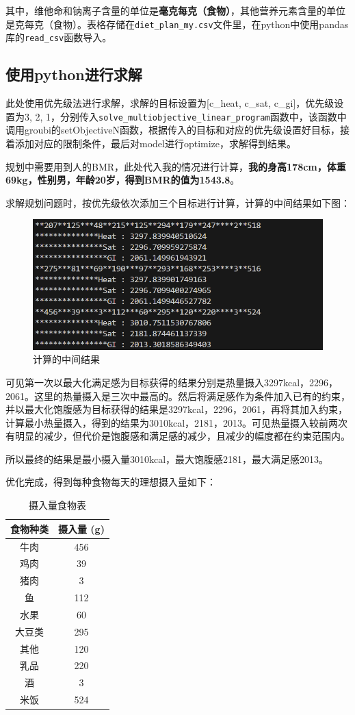 \documentclass{SYSUReport}
\begin{document}
其中，维他命和钠离子含量的单位是\textbf{毫克每克（食物）}，其他营养元素含量的单位是克每克（食物）。表格存储在\texttt{diet\_plan\_my.csv}文件里，在python中使用pandas库的\texttt{read\_csv}函数导入。

\subsection{使用python进行求解}
此处使用优先级法进行求解，求解的目标设置为[c\_heat, c\_sat, c\_gi]，优先级设置为3, 2, 1，分别传入\texttt{solve\_multiobjective\_linear\_program}函数中，该函数中调用groubi的setObjectiveN函数，根据传入的目标和对应的优先级设置好目标，接着添加对应的限制条件，最后对model进行optimize，求解得到结果。

规划中需要用到人的BMR，此处代入我的情况进行计算，\textbf{我的身高178cm，体重69kg，性别男，年龄20岁，得到BMR的值为1543.8}。

求解规划问题时，按优先级依次添加三个目标进行计算，计算的中间结果如下图：
\begin{figure}[h]
	\centering
	\includegraphics[width=0.6\linewidth]{figures/fig1.png}
	\caption{计算的中间结果}
	\label{mid-result-fig}
\end{figure}

可见第一次以最大化满足感为目标获得的结果分别是热量摄入3297kcal，2296，2061。这里的热量摄入是三次中最高的。然后将满足感作为条件加入已有的约束，并以最大化饱腹感为目标获得的结果是3297kcal，2296，2061，再将其加入约束，计算最小热量摄入，得到的结果为3010kcal，2181，2013。可见热量摄入较前两次有明显的减少，但代价是饱腹感和满足感的减少，且减少的幅度都在约束范围内。

所以最终的结果是最小摄入量3010kcal，最大饱腹感2181，最大满足感2013。

优化完成，得到每种食物每天的理想摄入量如下：
\begin{table}[h!]
\centering
\renewcommand\arraystretch{0.65}
\begin{tabular}{cc}
\toprule
食物种类 & 摄入量 (g) \\
\midrule
牛肉 & 456 \\
鸡肉 & 39 \\
猪肉 & 3 \\
鱼 & 112 \\
水果 & 60 \\
大豆类 & 295 \\
其他 & 120 \\
乳品 & 220 \\
酒 & 3 \\
米饭 & 524 \\
\bottomrule
\end{tabular}
\caption{摄入量食物表}
\label{food-intake-table}
\end{table}
\end{document}

